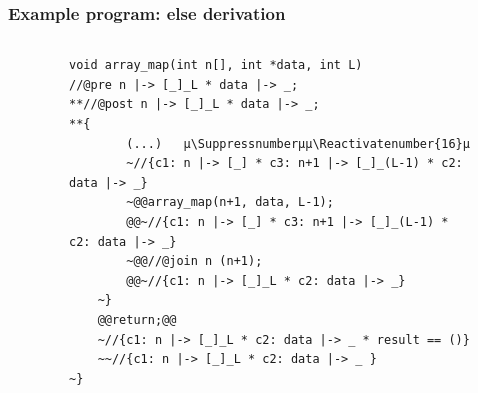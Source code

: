\documentclass{beamer}
\makeatletter
\let\origthelstnumber\thelstnumber
\newcommand*\Suppressnumber{%
  \lst@AddToHook{OnNewLine}{%
    \let\thelstnumber\relax%
     \advance\c@lstnumber-\@ne\relax%
    }%
}
\newcommand*\Reactivatenumber[1]{%
  \setcounter{lstnumber}{\numexpr#1-1\relax}
  \lst@AddToHook{OnNewLine}{%
   \let\thelstnumber\origthelstnumber%
   \refstepcounter{lstnumber}
  }%
}
\makeatother
\begin{document}
\begin{frame}[fragile]
\frametitle{Example program: else derivation}
\vspace{-2em}
\begin{columns}
\begin{column}{0.03\textwidth}
\end{column}
\begin{column}{0.97\textwidth}
\begin{figure}[h]
  \centering
\begin{lstlisting}[style=CStyleOverlay, captionpos = t]
void array_map(int n[], int *data, int L)
//@pre n |-> [_]_L * data |-> _;
**//@post n |-> [_]_L * data |-> _;
**{
		(...)	µ\Suppressnumberµµ\Reactivatenumber{16}µ
		~//{c1: n |-> [_] * c3: n+1 |-> [_]_(L-1) * c2: data |-> _}
		~@@array_map(n+1, data, L-1);
		@@~//{c1: n |-> [_] * c3: n+1 |-> [_]_(L-1) * c2: data |-> _}
		~@@//@join n (n+1);
		@@~//{c1: n |-> [_]_L * c2: data |-> _}
	~}
	@@return;@@
	~//{c1: n |-> [_]_L * c2: data |-> _ * result == ()}
	~~//{c1: n |-> [_]_L * c2: data |-> _ }
~}
\end{lstlisting}
\end{figure}
\end{column}
\end{columns}
\end{frame}
\end{document}

